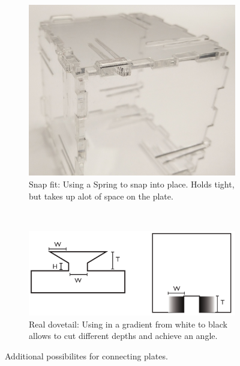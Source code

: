 \documentclass[../ClassicThesis.tex]{subfiles}
\begin{document}
\begin{figure}
    \begin{subfigure}[b]{0.45\textwidth}
    \includegraphics[width=\textwidth]{Images/snapfit.jpg}
    \caption{Snap fit: Using a Spring to snap into place. Holds tight, but takes up alot of space on the plate.}
    \end{subfigure}
    ~
    \begin{subfigure}[b]{0.45\textwidth}
    \includegraphics[width=\textwidth]{Images/06-2-joints-schwalbeMitLaser.png}
    \caption{Real dovetail: Using in a gradient \cite{lasercutLikeABoss} from white to black allows to cut different depths and achieve an angle.}
    \end{subfigure}
    \caption{Additional possibilites for connecting plates.}
    \label{fig:additionalJoints}
\end{figure}
\end{document}
